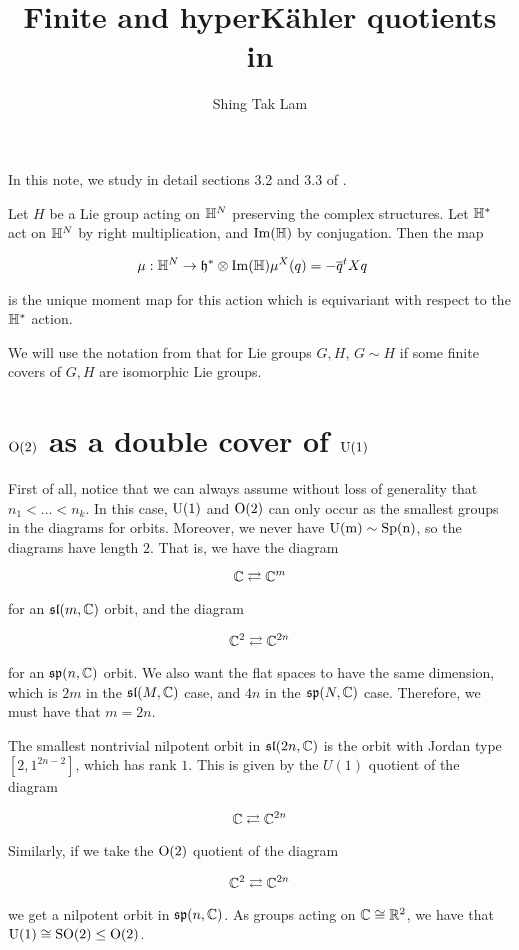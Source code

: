 \documentclass{article}
\title{Finite and hyperK\"ahler quotients in \citetitle{kobak_classical_1996}}
\author{Shing Tak Lam}
\DeclareMathOperator{\Sp}{Sp}
\renewcommand{\sl}{\mfs\mfl}
\renewcommand{\sp}{\mfs\mfp}
\newcommand{\rla}{\rightleftarrows}
\DeclareMathOperator{\SO}{SO}
\begin{document}
\maketitle

In this note, we study in detail sections 3.2 and 3.3 of  \cite{kobak_classical_1996}.

\begin{lemma*}
     Let \(H\) be a Lie group acting on \(\mathbb{H}^N\) preserving the complex structures. Let \(\mathbb{H}^*\) act on \(\mathbb{H}^N\) by right multiplication, and \(\Im(\mathbb{H})\) by conjugation. Then the map

    \begin{align*}
        \mu : \mathbb{H}^N &\to \mathfrak{h}^* \otimes \Im(\mathbb{H})
        \mu^X(q) = -\overline q^t X q
    \end{align*}

    is the unique moment map for this action which is equivariant with respect to the \(\mathbb{H}^*\) action.
\end{lemma*}

We will use the notation from \cite[p. 19]{kobak_classical_1996} that for Lie groups \(G, H\), \(G \sim H\) if some finite covers of \(G, H\) are isomorphic Lie groups.

\section*{\(\rm O(2)\) as a double cover of \(\rm U(1)\)}

First of all, notice that we can always assume without loss of generality that \(n_1 < \dots < n_k\). In this case, \(\rm U(1)\) and \(\rm O(2)\) can only occur as the smallest groups in the diagrams for orbits. Moreover, we never have \(\rm U(m) \sim \Sp(n)\), so the diagrams have length \(2\). That is, we have the diagram

\[\C \rla \C^m\]

for an \(\sl(m, \C)\) orbit, and the diagram

\[\C^2 \rla \C^{2n}\]

for an \(\sp(n, \C)\) orbit. We also want the flat spaces to have the same dimension, which is \(2m\) in the \(\sl(M, \C)\) case, and \(4n\) in the \(\sp(N, \C)\) case. Therefore, we must have that \(m = 2n\).

The smallest nontrivial nilpotent orbit in \(\sl(2n, \C)\) is the orbit with Jordan type \([2, 1^{2n - 2}]\), which has rank \(1\). This is given by the \(U(1)\) quotient of the diagram

\[\C \rla \C^{2n}\]

Similarly, if we take the \(\rm O(2)\) quotient of the diagram

\[\C^2 \rla \C^{2n}\]

we get a nilpotent orbit in \(\sp(n, \C)\). As groups acting on \(\mathbb{C} \cong \mathbb{R}^2\), we have that \(\rm U(1) \cong \SO(2) \le \rm O(2)\).

\printbibliography
\end{document}
